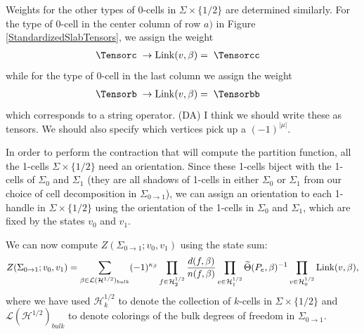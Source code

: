 \documentclass[12pt,a4paper]{article}
\newcounter{arrow}
\newcommand{\tp}{\otimes}
\newcommand{\ra}{\rightarrow}
\newcommand{\mch}{\mathcal{H}}
\newcommand{\mcl}{\mathcal{L}}
\newcommand{\dave}[1]{{\color{ao(english)}\footnotesize{(DA) #1}}}
\begin{document}
Weights for the other types of 0-cells in $\Sigma \times \{1/2\}$ are determined similarly. For the type of 
0-cell in the center column of row $a)$ in Figure \ref{StandardizedSlabTensors}, we assign the weight
\begin{align}
\Tensorc \;\ra {\rm Link}(v,\beta) &= \; \Tensorcc %
\end{align}
while for the type of 0-cell in the last column we assign the weight
\begin{align}
\Tensorb \; \ra {\rm Link}(v,\beta) &= \;  \Tensorbb  %
\end{align}
which corresponds to a string operator. 
\dave{I think we should write these as tensors. 
We should also specify which vertices pick up a $(-1)^{|\mu|}$.} 

In order to perform the contraction that will compute the partition function, all the 1-cells 
$\Sigma \times \{1/2\}$ need an orientation. Since these 1-cells biject with the 1-cells of $\Sigma_0$ and $\Sigma_1$ (they are all shadows of 1-cells in either $\Sigma_0$ or $\Sigma_1$ from our 
choice of cell decomposition in $\Sigma_{0\ra1}$), we can assign an orientation to each 1-handle in 
$\Sigma \times \{1/2\}$ using the orientation of the 1-cells in $\Sigma_0$ and $\Sigma_1$, which 
are fixed by the states $v_0$ and $v_1$.

We can now compute $Z(\Sigma_{0\ra1}; v_0, v_1)$ 
using the state sum: 
\begin{align} 
Z(\Sigma_{0\ra1}; v_0, v_1) = \sum_{ \beta\in\mcl(\mch^{1/2})_{bulk}}  (-1)^{\kappa_\beta} \prod_{f \in \mch^{1/2}_2} \frac{d(f,\beta)}{n(f,\beta)} 
\prod_{e \in \mch^{1/2}_1} \widetilde{\Theta}(P_e,\beta)^{-1} \prod_{v \in \mch^{1/2}_0} {\rm Link}(v,\beta),
\end{align} 
where we have used $\mch^{1/2}_k$ to denote the collection of $k$-cells in $\Sigma \times \{1/2\}$ and $\mcl(\mch^{1/2})_{bulk}$ 
to denote colorings of the bulk degrees of freedom in $\Sigma_{0\ra1}$. 







{}



\end{document}
